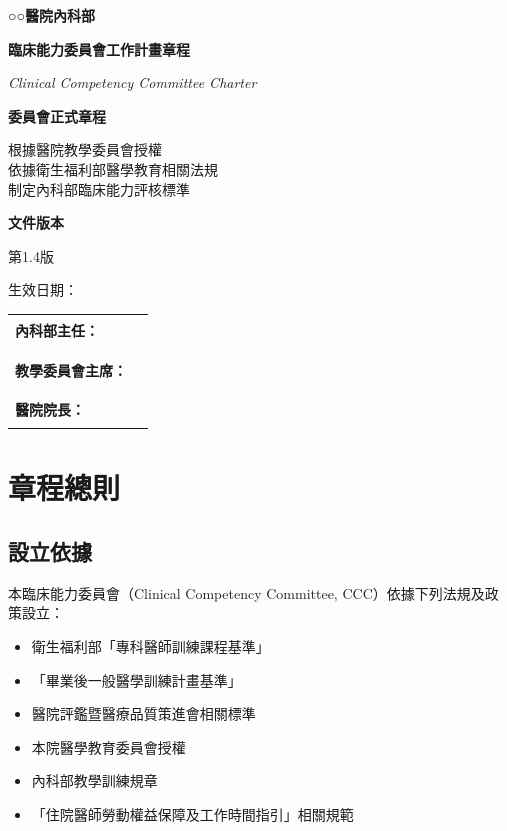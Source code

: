 \documentclass[12pt,a4paper]{article}
\newcommand{\mydate}{\DTMtoday}
\begin{document}
\begin{titlepage}
    \centering
    \vspace*{2cm}
    {\LARGE\textcolor{emergency_red}{\textbf{○○醫院內科部}}\par}
    \vspace{1cm}
    {\huge\bfseries 臨床能力委員會工作計畫章程\par}
    \vspace{0.5cm}
    {\Large\textcolor{emergency_blue}{\textit{Clinical Competency Committee Charter}}\par}
    \vspace{2cm}
    \begin{tcolorbox}[
        colback=emergency_blue!5!white,
        colframe=emergency_blue,
        width=0.8\textwidth,
        arc=10pt,
        boxrule=1pt
    ]
    \centering
    {\large\textbf{委員會正式章程}\par}
    \vspace{0.5cm}
    根據醫院教學委員會授權\\
    依據衛生福利部醫學教育相關法規\\
    制定內科部臨床能力評核標準\\
    \vspace{0.5cm}
    {\large\textbf{文件版本}\par}
    \vspace{0.3cm}
    第1.4版\par
    生效日期：\mydate
    \end{tcolorbox}
    \vfill
    \begin{center}
    \begin{tabular}{lr}
    \textbf{內科部主任：} & \rule{5cm}{0.5pt} \\
    & \\
    \textbf{教學委員會主席：} & \rule{5cm}{0.5pt} \\
    & \\
    \textbf{醫院院長：} & \rule{5cm}{0.5pt} \\
    \end{tabular}
    \end{center}
    \vspace{1cm}
\end{titlepage}
\newpage
\tableofcontents
\newpage
\section{章程總則}
\subsection{設立依據}
本臨床能力委員會（Clinical Competency Committee, CCC）依據下列法規及政策設立：
\begin{itemize}[nosep]
    \item 衛生福利部「專科醫師訓練課程基準」
    \item 「畢業後一般醫學訓練計畫基準」
    \item 醫院評鑑暨醫療品質策進會相關標準
    \item 本院醫學教育委員會授權
    \item 內科部教學訓練規章
    \item 「住院醫師勞動權益保障及工作時間指引」相關規範
\end{itemize}
\end{document}
